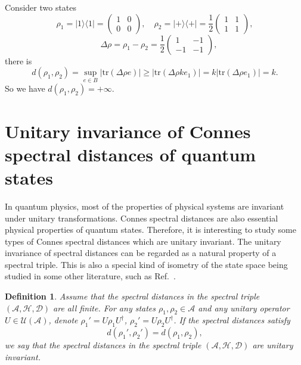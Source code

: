 \documentclass[a4paper,12pt]{article}
\newtheorem{definition}{Definition}
\begin{document}
Consider two states
\begin{equation}
  \rho_1 = |1 \rangle \langle 1| = \left(\begin{array}{cc}
    1 & 0\\
    0 & 0
  \end{array}\right), \quad \rho_2 = | + \rangle \langle + | = \frac{1}{2}
  \left(\begin{array}{cc}
    1 & 1\\
    1 & 1
  \end{array}\right),
\end{equation}
\begin{equation}
  \quad \Delta \rho = \rho_1 - \rho_2 = \frac{1}{2} \left(\begin{array}{cc}
    1 & - 1\\
    - 1 & - 1
  \end{array}\right),
\end{equation}
there is
\begin{equation}
  d (\rho_1, \rho_2) = \sup_{e \in B} | \mathrm{tr} (\Delta \rho e) |
  \geqslant | \mathrm{tr} (\Delta \rho k e_1) | = k | \mathrm{tr} (\Delta \rho
  e_1) | = k.
\end{equation}
So we have $d (\rho_1, \rho_2) = + \infty$.



\section{Unitary invariance of Connes spectral distances of quantum states}\label{sec4}

In quantum physics, most of the properties of physical systems are invariant
under unitary transformations. Connes spectral distances are also essential
physical properties of quantum states. Therefore, it is interesting to study
some types of Connes spectral distances which are unitary invariant. The
unitary invariance of spectral distances can be regarded as a natural property
of a spectral triple. This is also a special kind of isometry of the state space being studied in some other literature, such as Ref.~\cite{Martinettip}.

\begin{definition}
  Assume that the spectral distances in the spectral triple $(\mathcal{A},
  \mathcal{H}, \mathcal{D})$ are all finite. For any states $\rho_1, \rho_2
  \in \mathcal{A}$ and any unitary operator $U \in \mathcal{U} (\mathcal{A})$,
  denote $\rho_1' = U \rho_1 U^{\dag}$, $\rho_2' = U \rho_2 U^{\dag}$. If the
  spectral distances satisfy
  \begin{equation}
    d (\rho_1', \rho_2') = d (\rho_1, \rho_2),
  \end{equation}
  we say that the spectral distances in the spectral triple $(\mathcal{A},
  \mathcal{H}, \mathcal{D})$ are \textit{unitary invariant}.
\end{definition}
\end{document}

